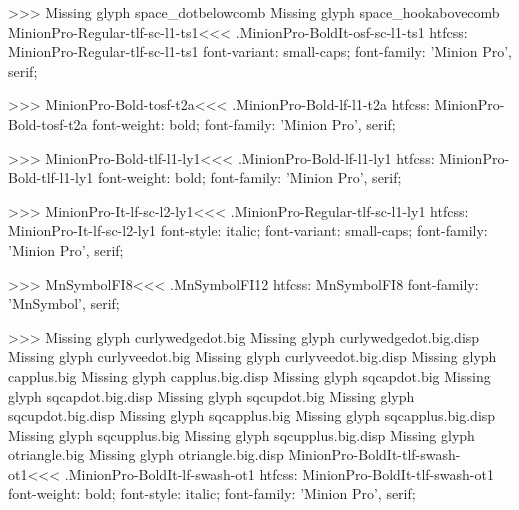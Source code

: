 {>>>
Missing glyph	space_dotbelowcomb
Missing glyph	space_hookabovecomb
\<MinionPro-Regular-tlf-sc-l1-ts1\><<<
.MinionPro-BoldIt-osf-sc-l1-ts1
htfcss:  MinionPro-Regular-tlf-sc-l1-ts1  font-variant: small-caps; font-family: 'Minion Pro', serif;

>>>
\<MinionPro-Bold-tosf-t2a\><<<
.MinionPro-Bold-lf-l1-t2a
htfcss:  MinionPro-Bold-tosf-t2a  font-weight: bold; font-family: 'Minion Pro', serif;

>>>
\<MinionPro-Bold-tlf-l1-ly1\><<<
.MinionPro-Bold-lf-l1-ly1
htfcss:  MinionPro-Bold-tlf-l1-ly1  font-weight: bold; font-family: 'Minion Pro', serif;

>>>
\<MinionPro-It-lf-sc-l2-ly1\><<<
.MinionPro-Regular-tlf-sc-l1-ly1
htfcss:  MinionPro-It-lf-sc-l2-ly1  font-style: italic; font-variant: small-caps; font-family: 'Minion Pro', serif;

>>>
\<MnSymbolFI8\><<<
.MnSymbolFI12
htfcss:  MnSymbolFI8  font-family: 'MnSymbol', serif;

>>>
Missing glyph	curlywedgedot.big
Missing glyph	curlywedgedot.big.disp
Missing glyph	curlyveedot.big
Missing glyph	curlyveedot.big.disp
Missing glyph	capplus.big
Missing glyph	capplus.big.disp
Missing glyph	sqcapdot.big
Missing glyph	sqcapdot.big.disp
Missing glyph	sqcupdot.big
Missing glyph	sqcupdot.big.disp
Missing glyph	sqcapplus.big
Missing glyph	sqcapplus.big.disp
Missing glyph	sqcupplus.big
Missing glyph	sqcupplus.big.disp
Missing glyph	otriangle.big
Missing glyph	otriangle.big.disp
\<MinionPro-BoldIt-tlf-swash-ot1\><<<
.MinionPro-BoldIt-lf-swash-ot1
htfcss:  MinionPro-BoldIt-tlf-swash-ot1  font-weight: bold; font-style: italic; font-family: 'Minion Pro', serif;

}
